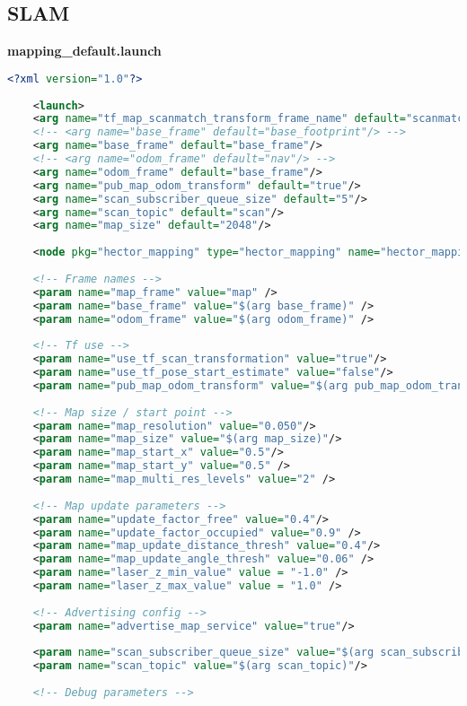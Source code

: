 \begin{appendices}
	\section{SLAM}
	
	\textbf{mapping\_default.launch}
	\begin{lstlisting}[language=XML]
	<?xml version="1.0"?>
	
	<launch>
	<arg name="tf_map_scanmatch_transform_frame_name" default="scanmatcher_frame"/>
	<!-- <arg name="base_frame" default="base_footprint"/> -->
	<arg name="base_frame" default="base_frame"/>
	<!-- <arg name="odom_frame" default="nav"/> -->
	<arg name="odom_frame" default="base_frame"/>
	<arg name="pub_map_odom_transform" default="true"/>
	<arg name="scan_subscriber_queue_size" default="5"/>
	<arg name="scan_topic" default="scan"/>
	<arg name="map_size" default="2048"/>
	
	<node pkg="hector_mapping" type="hector_mapping" name="hector_mapping" output="screen">
	
	<!-- Frame names -->
	<param name="map_frame" value="map" />
	<param name="base_frame" value="$(arg base_frame)" />
	<param name="odom_frame" value="$(arg odom_frame)" />
	
	<!-- Tf use -->
	<param name="use_tf_scan_transformation" value="true"/>
	<param name="use_tf_pose_start_estimate" value="false"/>
	<param name="pub_map_odom_transform" value="$(arg pub_map_odom_transform)"/>
	
	<!-- Map size / start point -->
	<param name="map_resolution" value="0.050"/>
	<param name="map_size" value="$(arg map_size)"/>
	<param name="map_start_x" value="0.5"/>
	<param name="map_start_y" value="0.5" />
	<param name="map_multi_res_levels" value="2" />
	
	<!-- Map update parameters -->
	<param name="update_factor_free" value="0.4"/>
	<param name="update_factor_occupied" value="0.9" />    
	<param name="map_update_distance_thresh" value="0.4"/>
	<param name="map_update_angle_thresh" value="0.06" />
	<param name="laser_z_min_value" value = "-1.0" />
	<param name="laser_z_max_value" value = "1.0" />
	
	<!-- Advertising config --> 
	<param name="advertise_map_service" value="true"/>
	
	<param name="scan_subscriber_queue_size" value="$(arg scan_subscriber_queue_size)"/>
	<param name="scan_topic" value="$(arg scan_topic)"/>
	
	<!-- Debug parameters -->


\end{lstlisting}
\end{appendices}
